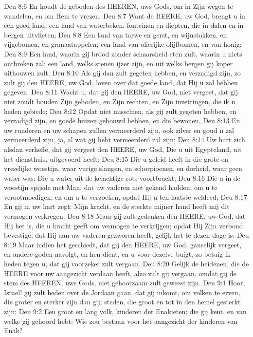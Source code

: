 Deu 8:6  En houdt de geboden des HEEREN, uws Gods, om in Zijn wegen te wandelen, en om Hem te vrezen.
Deu 8:7  Want de HEERE, uw God, brengt u in een goed land, een land van waterbeken, fonteinen en diepten, die in dalen en in bergen uitvlieten;
Deu 8:8  Een land van tarwe en gerst, en wijnstokken, en vijgebomen, en granaatappelen; een land van olierijke olijfbomen, en van honig;
Deu 8:9  Een land, waarin gij brood zonder schaarsheid eten zult, waarin u niets ontbreken zal; een land, welks stenen ijzer zijn, en uit welks bergen gij koper uithouwen zult.
Deu 8:10  Als gij dan zult gegeten hebben, en verzadigd zijn, zo zult gij den HEERE, uw God, loven over dat goede land, dat Hij u zal hebben gegeven.
Deu 8:11  Wacht u, dat gij den HEERE, uw God, niet vergeet, dat gij niet zoudt houden Zijn geboden, en Zijn rechten, en Zijn inzettingen, die ik u heden gebiede;
Deu 8:12  Opdat niet misschien, als gij zult gegeten hebben, en verzadigd zijn, en goede huizen gebouwd hebben, en die bewonen,
Deu 8:13  En uw runderen en uw schapen zullen vermeerderd zijn, ook zilver en goud u zal vermeerderd zijn, ja, al wat gij hebt vermeerderd zal zijn;
Deu 8:14  Uw hart zich alsdan verheffe, dat gij vergeet den HEERE, uw God, Die u uit Egypteland, uit het diensthuis, uitgevoerd heeft;
Deu 8:15  Die u geleid heeft in die grote en vreselijke woestijn, waar vurige slangen, en schorpioenen, en dorheid, waar geen water was; Die u water uit de keiachtige rots voortbracht;
Deu 8:16  Die u in de woestijn spijsde met Man, dat uw vaderen niet gekend hadden; om u te verootmoedigen, en om u te verzoeken, opdat Hij u ten laatste weldeed;
Deu 8:17  En gij in uw hart zegt: Mijn kracht, en de sterkte mijner hand heeft mij dit vermogen verkregen.
Deu 8:18  Maar gij zult gedenken den HEERE, uw God, dat Hij het is, die u kracht geeft om vermogen te verkrijgen; opdat Hij Zijn verbond bevestige, dat Hij aan uw vaderen gezworen heeft, gelijk het te dezen dage is.
Deu 8:19  Maar indien het geschiedt, dat gij den HEERE, uw God, ganselijk vergeet, en andere goden navolgt, en hen dient, en u voor dezelve buigt, zo betuig ik heden tegen u, dat gij voorzeker zult vergaan.
Deu 8:20  Gelijk de heidenen, die de HEERE voor uw aangezicht verdaan heeft, alzo zult gij vergaan, omdat gij de stem des HEEREN, uws Gods, niet gehoorzaam zult geweest zijn.
Deu 9:1  Hoor, Israel! gij zult heden over de Jordaan gaan, dat gij inkomt, om volken te erven, die groter en sterker zijn dan gij; steden, die groot en tot in den hemel gesterkt zijn;
Deu 9:2  Een groot en lang volk, kinderen der Enakieten; die gij kent, en van welke gij gehoord hebt: Wie zou bestaan voor het aangezicht der kinderen van Enak?
